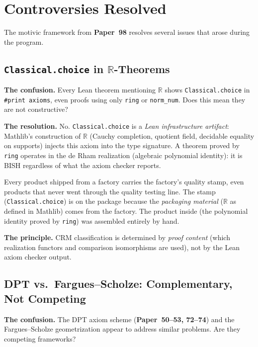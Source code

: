 \documentclass[11pt,twoside,openany]{report}
\theoremstyle{remark}
\newcommand{\BISH}{\textsf{BISH}}
\newcommand{\paperref}[1]{\textbf{Paper~#1}}
\begin{document}
\chapter{Controversies Resolved}\label{app:controversies}

The motivic framework from \paperref{98} resolves several issues that arose during the program.

\section{\texttt{Classical.choice} in $\mathbb{R}$-Theorems}

\textbf{The confusion.} Every Lean theorem mentioning $\mathbb{R}$ shows \texttt{Classical.choice} in \texttt{\#print axioms}, even proofs using only \texttt{ring} or \texttt{norm\_num}. Does this mean they are not constructive?

\textbf{The resolution.} No. \texttt{Classical.choice} is a \emph{Lean infrastructure artifact}: Mathlib's construction of $\mathbb{R}$ (Cauchy completion, quotient field, decidable equality on supports) injects this axiom into the type signature. A theorem proved by \texttt{ring} operates in the de Rham realization (algebraic polynomial identity): it is \BISH{} regardless of what the axiom checker reports.

\begin{analogybox}
Every product shipped from a factory carries the factory's quality stamp, even products that never went through the quality testing line. The stamp (\texttt{Classical.choice}) is on the package because the \emph{packaging material} ($\mathbb{R}$ as defined in Mathlib) comes from the factory. The product inside (the polynomial identity proved by \texttt{ring}) was assembled entirely by hand.
\end{analogybox}

\textbf{The principle.} CRM classification is determined by \emph{proof content} (which realization functors and comparison isomorphisms are used), not by the Lean axiom checker output.


\section{DPT vs.\ Fargues--Scholze: Complementary, Not Competing}

\textbf{The confusion.} The DPT axiom scheme (\paperref{50--53, 72--74}) and the Fargues--Scholze geometrization appear to address similar problems. Are they competing frameworks?
\end{document}
